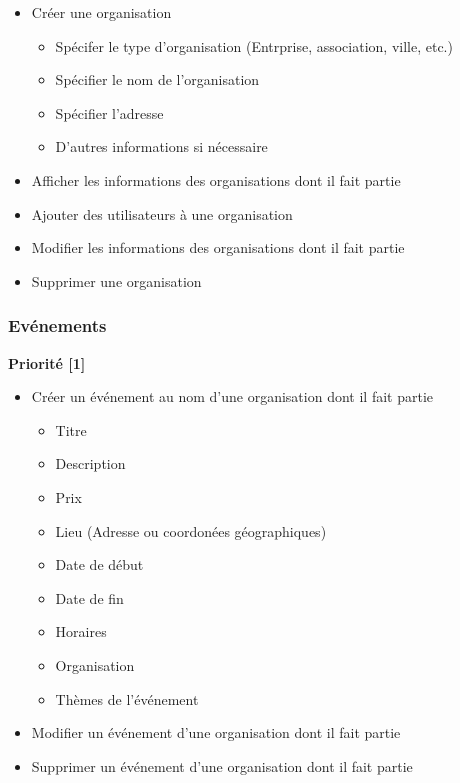 \documentclass[11pt, a4paper, french, twoside]{article}
\begin{document}
				\begin{itemize}
					\item Créer une organisation
						\begin{itemize}
							\item Spécifer le type d'organisation (Entrprise, association, ville, etc.)
							\item Spécifier le nom de l'organisation
							\item Spécifier l'adresse
							\item D'autres informations si nécessaire
						\end{itemize}
					\item Afficher les informations des organisations dont il fait partie
					\item Ajouter des utilisateurs à une organisation
					\item Modifier les informations des organisations dont il fait partie
					\item Supprimer une organisation
				\end{itemize}
			
			\subsubsection{Evénements}
			\label{subsubsec:evenements}
				
				\textbf{Priorité [1]}
			
				\begin{itemize}
					\item Créer un événement au nom d'une organisation dont il fait partie
						\begin{itemize}
							\item Titre
							\item Description
							\item Prix
							\item Lieu (Adresse ou coordonées géographiques)
							\item Date de début
							\item Date de fin
							\item Horaires
							\item Organisation
							\item Thèmes de l'événement
						\end{itemize}
					\item Modifier un événement d'une organisation dont il fait partie
					\item Supprimer un événement d'une organisation dont il fait partie
				\end{itemize}
		
\end{document}
